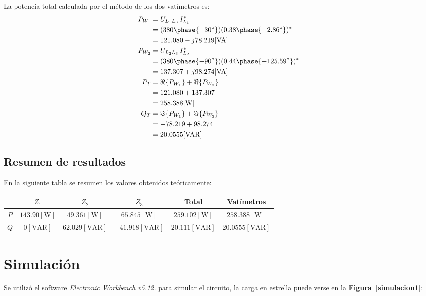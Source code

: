 \documentclass[letter,11pt]{article}
\begin{document}
La potencia total calculada por el método de los dos vatímetros es:
\begin{equation*}
    \begin{split}
        P_{W_1} &= U_{L_1 L_3}\,I_{L_1}^*\\
                &= (380\phase{-30^{\circ}})(0.38\phase{-2.86^{\circ}})^*\\
                &= 121.080 - j78.219[\text{VA}]\\
        P_{W_2} &= U_{L_2 L_3}\,I_{L_2}^*\\
                &= (380\phase{-90^{\circ}})(0.44\phase{-125.59^{\circ}})^*\\
                &= 137.307 + j98.274[\text{VA}]\\
        P_T &= \Re\{P_{W_1}\} + \Re\{P_{W_2}\}\\
            &= 121.080 + 137.307\\
            &= 258.388[\text{W}]\\
        Q_T &= \Im\{P_{W_1}\} + \Im\{P_{W_2}\}\\
            &= -78.219 + 98.274\\
            &= 20.0555[\text{VAR}]\\
    \end{split}
\end{equation*}

\subsection{Resumen de resultados}
En la siguiente tabla se resumen los valores obtenidos teóricamente:

\begin{center}
    \begin{tabular}{|c||c|c|c|c||c|}
    \hline
    & \textbf{$Z_1$} & $Z_2$ & $Z_3$ & \textbf{Total} & \textbf{Vatímetros}
    \tabularnewline \hline \hline
    $P$ &
    $143.90[\text{W}]$ &
    $49.361[\text{W}]$ &
    $65.845[\text{W}]$ &
    $259.102[\text{W}]$ &
    $258.388[\text{W}]$
    \tabularnewline \hline
    $Q$ &
    $0[\text{VAR}]$ &
    $62.029[\text{VAR}]$ &
    $-41.918[\text{VAR}]$ &
    $20.111[\text{VAR}]$ &
    $20.0555[\text{VAR}]$
    \tabularnewline \hline
    \end{tabular}
\end{center}

\section{Simulación}
Se utilizó el software \emph{Electronic Workbench v5.12.} para simular
el circuito, la carga en estrella puede verse en la
\textbf{Figura~\ref{simulacion1}}:
\end{document}
